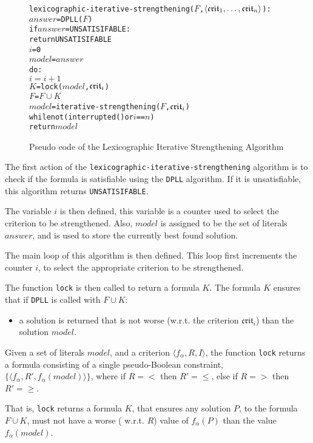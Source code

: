\begin{figure}[htp]
\begin{center}
\begin{alltt}
lexicographic-iterative-strengthening(\(F\),\(\langle{}\mathfrak{crit}\sb{1}, \ldots ,\mathfrak{crit}\sb{n}\rangle\)):  
    \(answer\) = DPLL(\(F\))
    if \(answer\) = UNSATISIFABLE:
        return UNSATISIFABLE
    \(i\) = 0
    \(model\) = \(answer\)
    do:
        \(i = i + 1\)
        \(K\) = lock(\(model\),\(\mathfrak{crit}\sb{i}\))
        \(F\) = \(F \cup K\)
        \(model\) = iterative-strengthening(\(F\),\(\mathfrak{crit}\sb{i}\))
    while not (interrupted() or \(i\) == \(n\))
    return \(model\) 
\end{alltt}
  \caption{Pseudo code of the Lexicographic Iterative Strengthening Algorithm}
  \label{impl.lexstrength}
\end{center}
\end{figure}

The first action of the \texttt{lexicographic-iterative-strengthening} algorithm is to check if the formula is satisfiable using the \texttt{DPLL} algorithm.
If it is unsatisfiable, this algorithm returns \texttt{UNSATISIFABLE}.

The variable $i$ is then defined, this variable is a counter used to select the criterion to be strengthened.
Also, $model$ is assigned to be the set of literals $answer$, and is used to store the currently best found solution.

The main loop of this algorithm is then defined.
This loop first increments the counter $i$, to select the appropriate criterion to be strengthened.

The function \texttt{lock} is then called to return a formula $K$.
The formula $K$ ensures that if \texttt{DPLL} is called with $F \cup K$:
\begin{itemize}
  \item a solution is returned that is not worse (w.r.t. the criterion $\mathfrak{crit}_i$) than the solution $model$. 
\end{itemize}

\begin{defs}
Given a set of literals $model$, and a criterion $\langle f_{\alpha}, R, I \rangle$,
the function \texttt{lock} returns a formula consisting of a single pseudo-Boolean constraint, $\{ \langle f_{\alpha},R',f_{\alpha}(model) \rangle \}$,
where if $R = <$ then $R' = \leq$, else if $R = >$ then $R' = \geq$.
\end{defs}
That is, \texttt{lock} returns a formula $K$,
that ensures any solution $P$, to the formula $F \cup K$, must not have a worse ( w.r.t. $R$) value of $f_{\alpha}(P)$ than the value $f_{\alpha}(model)$.

